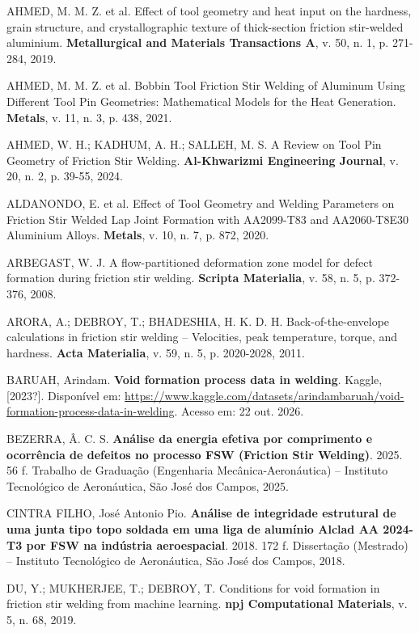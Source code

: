 \documentclass[12pt,openany]{report}
\begin{document}
\begin{singlespace}
\raggedright
\setlength{\parindent}{0pt}
\setlength{\parskip}{\baselineskip}
AHMED, M. M. Z. et al. Effect of tool geometry and heat input on the hardness, grain structure, and crystallographic texture of thick-section friction stir-welded aluminium. \textbf{Metallurgical and Materials Transactions A}, v. 50, n. 1, p. 271-284, 2019.

AHMED, M. M. Z. et al. Bobbin Tool Friction Stir Welding of Aluminum Using Different Tool Pin Geometries: Mathematical Models for the Heat Generation. \textbf{Metals}, v. 11, n. 3, p. 438, 2021.

AHMED, W. H.; KADHUM, A. H.; SALLEH, M. S. A Review on Tool Pin Geometry of Friction Stir Welding. \textbf{Al-Khwarizmi Engineering Journal}, v. 20, n. 2, p. 39-55, 2024.

ALDANONDO, E. et al. Effect of Tool Geometry and Welding Parameters on Friction Stir Welded Lap Joint Formation with AA2099-T83 and AA2060-T8E30 Aluminium Alloys. \textbf{Metals}, v. 10, n. 7, p. 872, 2020.

ARBEGAST, W. J. A flow-partitioned deformation zone model for defect formation during friction stir welding. \textbf{Scripta Materialia}, v. 58, n. 5, p. 372-376, 2008.

ARORA, A.; DEBROY, T.; BHADESHIA, H. K. D. H. Back-of-the-envelope calculations in friction stir welding -- Velocities, peak temperature, torque, and hardness. \textbf{Acta Materialia}, v. 59, n. 5, p. 2020-2028, 2011.

BARUAH, Arindam. \textbf{Void formation process data in welding}. Kaggle, [2023?]. Disponível em: \url{https://www.kaggle.com/datasets/arindambaruah/void-formation-process-data-in-welding}. Acesso em: 22 out. 2026.

BEZERRA, Â. C. S. \textbf{Análise da energia efetiva por comprimento e ocorrência de defeitos no processo FSW (Friction Stir Welding)}. 2025. 56 f. Trabalho de Graduação (Engenharia Mecânica-Aeronáutica) -- Instituto Tecnológico de Aeronáutica, São José dos Campos, 2025.

CINTRA FILHO, José Antonio Pio. \textbf{Análise de integridade estrutural de uma junta tipo topo soldada em uma liga de alumínio Alclad AA 2024-T3 por FSW na indústria aeroespacial}. 2018. 172 f. Dissertação (Mestrado) -- Instituto Tecnológico de Aeronáutica, São José dos Campos, 2018.

DU, Y.; MUKHERJEE, T.; DEBROY, T. Conditions for void formation in friction stir welding from machine learning. \textbf{npj Computational Materials}, v. 5, n. 68, 2019.


\end{singlespace}
\end{document}
